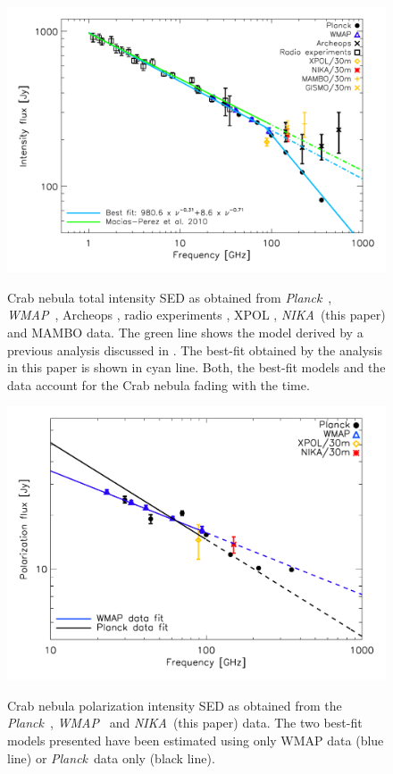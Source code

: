 \documentclass[twocolumn,traditabstract]{aa}
\def\NIKA{\textit{NIKA}}
\def\Planck{\textit{Planck}}
\def\WMAP{\textit{WMAP}}
\begin{document}
\begin{figure}
  \centering
          { \includegraphics[width=1\linewidth,keepaspectratio]{figures/Crab_SED_i_150.pdf}}
           \caption{Crab nebula total intensity SED as obtained from \Planck\ \citep{2015arXiv150702058P}, \WMAP\ \citep{2011ApJS..192...19W}, Archeops \citep{macias2007archeops}, radio experiments \citep{dmitrenko1970absolute, 1971IzVUZ..14..157V}, XPOL \citep{aumont2010}, \NIKA\ (this paper) and MAMBO \citep{2002A&A...386.1044B} data. The green line shows the model derived by a previous analysis discussed in \citep{macias2010}. The best-fit obtained by the analysis in this paper is shown in cyan line. Both, the best-fit models and the data account for the Crab nebula fading with the time.}
\label{crab_SED}		
  \end{figure} 

\begin{figure}
  \centering
             { \includegraphics[width=1\linewidth,keepaspectratio]{figures/Crab_SED_ipol.pdf}}
           \caption{Crab nebula polarization intensity SED as obtained from the \Planck\ \citep{2015arXiv150702058P}, \WMAP\ \citep{2011ApJS..192...19W} and \NIKA\ (this paper) data. The two best-fit models presented have been estimated using only WMAP data (blue line) or \Planck\ data only (black line).}
\label{crab_SED_ipol}		
  \end{figure} 
 \noindent
\end{document}
